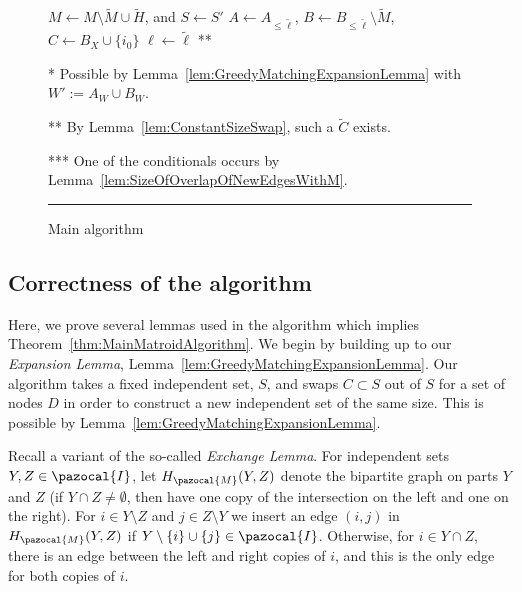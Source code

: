 \begin{figure}
\begin{algorithmic}
{\State $M \leftarrow M \setminus \tilde{M} \cup \tilde{H}$, and $S \leftarrow S'$ 
\State $A \leftarrow A_{\leq \tilde{\ell}}$, $B \leftarrow B_{\leq \tilde{\ell}} \setminus \tilde{M}$, $C \leftarrow B_X \cup \{ i_0\}$
\State $\ell \leftarrow \tilde{\ell}$
\EndIf ***
\EndWhile

\smallskip }
\footnotesize{
* Possible by Lemma~\ref{lem:GreedyMatchingExpansionLemma} with $W' := A_W \cup B_W$. 

** By Lemma~\ref{lem:ConstantSizeSwap}, such a $\tilde{C}$ exists.

*** One of the conditionals occurs by Lemma~\ref{lem:SizeOfOverlapOfNewEdgesWithM}.}
\end{algorithmic}
\hrule
\caption{Main algorithm} \label{fig:Algorithm}
\end{figure}


\subsection{Correctness of the algorithm}
Here, we prove several lemmas used in the algorithm which implies Theorem~\ref{thm:MainMatroidAlgorithm}. 
We begin by building up to our \textit{Expansion Lemma}, Lemma~\ref{lem:GreedyMatchingExpansionLemma}. 
Our algorithm takes a fixed independent set, $S$, and swaps $C \subset S$ out of $S$ for a set of nodes $D$
in order to construct a new independent set of the same size.
This is possible by Lemma~\ref{lem:GreedyMatchingExpansionLemma}. 

Recall a variant of the so-called \emph{Exchange Lemma}.
 For independent sets $Y,Z \in \pazocal{I}$, let $H_{\pazocal{M}}(Y,Z)$ 
 denote the bipartite graph on parts $Y$ and $Z$ (if $Y \cap Z \neq \emptyset$, 
 then have one copy of the intersection on the left and one on the right).
For  $i \in Y \setminus Z$ and $j \in Z \setminus Y$ we insert an edge $(i,j)$ 
in $H_{\pazocal{M}}(Y,Z)$ if $Y \setminus \{ i\} \cup \{ j\} \in \pazocal{I}$. 
Otherwise, for $i \in Y \cap Z$, there is an edge between the left and right copies of $i$,
 and this is the only edge for both copies of $i$. 

